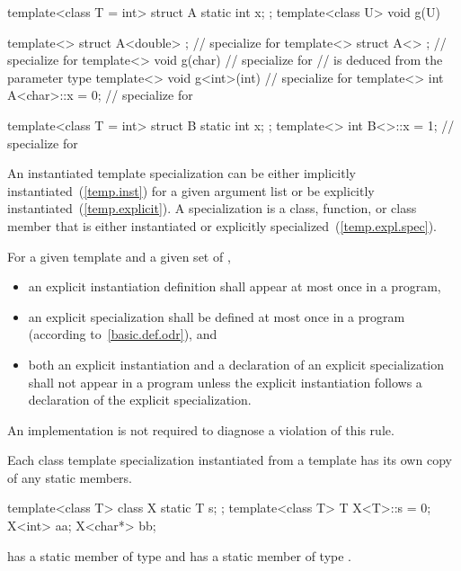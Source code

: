 \begin{codeblock}
template<class T = int> struct A {
  static int x;
};
template<class U> void g(U) { }

template<> struct A<double> { };        // specialize for 
template<> struct A<> { };              // specialize for 
template<> void g(char) { }             // specialize for 
                                        //  is deduced from the parameter type
template<> void g<int>(int) { }         // specialize for 
template<> int A<char>::x = 0;          // specialize for 

template<class T = int> struct B {
  static int x;
};
template<> int B<>::x = 1;              // specialize for 
\end{codeblock}
\exitexample

\pnum
An instantiated template specialization can be either implicitly
instantiated~(\ref{temp.inst}) for a given argument list or be explicitly
instantiated~(\ref{temp.explicit}).
A specialization is a class, function, or class member that is either
instantiated or explicitly specialized~(\ref{temp.expl.spec}).

\pnum
For a given template and a given set of
,
\begin{itemize}
\item
an explicit instantiation definition shall appear at most once in a program,
\item
an explicit specialization shall be defined at most once
in a program (according to~\ref{basic.def.odr}), and
\item
both an explicit instantiation and a declaration of an
explicit specialization shall not appear in a program unless
the explicit instantiation follows a declaration of the explicit
specialization.
\end{itemize}
An implementation is not required to diagnose a violation of this rule.

\pnum
Each class template specialization instantiated from a template has its own
copy of any static members.
\enterexample

\begin{codeblock}
template<class T> class X {
  static T s;
};
template<class T> T X<T>::s = 0;
X<int> aa;
X<char*> bb;
\end{codeblock}

has a static member
of type
and
has a static member
of type
.
\exitexample

